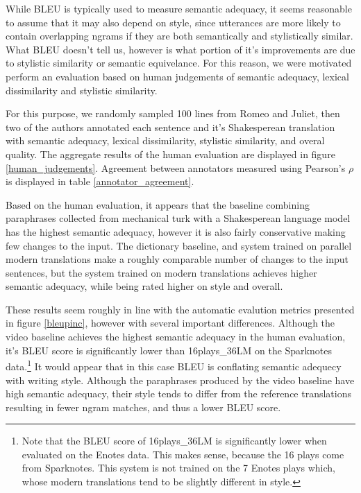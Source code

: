 \documentclass[10pt,a5paper,twoside]{article}
\begin{document}
While BLEU is typically used to measure semantic adequacy, it seems reasonable to assume that it may also depend on style, since utterances
are more likely to contain overlapping ngrams if they are both semantically and stylistically similar.  What BLEU doesn't tell us, however
is what portion of it's improvements are due to stylistic similarity or semantic equivelance.  For this reason, we were motivated perform
an evaluation based on human judgements of semantic adequacy, lexical dissimilarity and stylistic similarity.

For this purpose, we randomly sampled 100 lines from Romeo and Juliet, then two of the authors annotated each sentence and it's Shakesperean
translation with semantic adequacy, lexical dissimilarity, stylistic similarity, and overal quality.
The aggregate results of the human evaluation are displayed in figure \ref{human_judgements}.  Agreement between annotators
measured using Pearson's $\rho$ is displayed in table \ref{annotator_agreement}.

Based on the human evaluation, it appears that the baseline combining paraphrases collected from mechanical turk \cite{chen11} with
a Shakesperean language model has the highest semantic adequacy, however it is also fairly conservative making few changes to the input.
The dictionary baseline, and system trained on parallel modern translations make a roughly comparable number of changes to the input
sentences, but the system trained on modern translations achieves higher semantic adequacy, while being rated higher on style and overall.

These results seem roughly in line with the automatic evalution metrics presented in figure \ref{bleupinc}, however with several important
differences.  Although the video baseline achieves the highest semantic adequacy in the human evaluation, it's BLEU score
is significantly lower than 16plays\_36LM on the Sparknotes data.\footnote{
Note that the BLEU score of 16plays\_36LM is significantly lower when evaluated on the Enotes data.  This makes sense, because the 
16 plays come from Sparknotes. This system is not trained on the 7 Enotes plays which, whose modern translations tend
to be slightly different in style.}
It would appear that in this case BLEU is conflating semantic adequecy with writing style.  Although the paraphrases produced 
by the video baseline have high semantic adequacy, their style tends to differ from the reference translations resulting
in fewer ngram matches, and thus a lower BLEU score.
\end{document}
